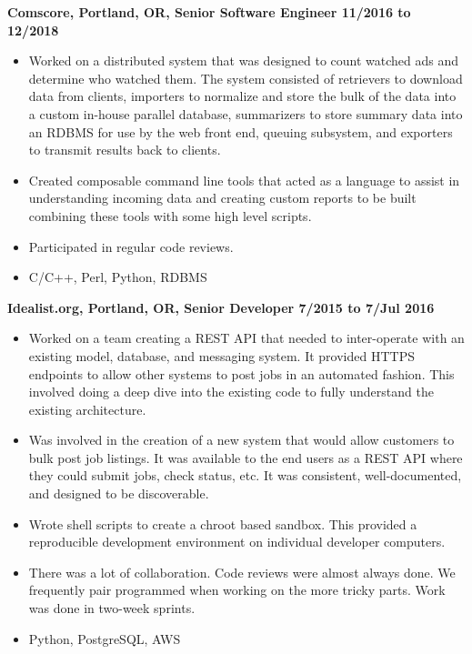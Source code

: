 \documentclass{res}
\begin{document}
\begin{resume}
  {\large \bf Comscore, Portland, OR, Senior Software Engineer \hfill 11/2016 to 12/2018}
  \begin{itemize}

  \item
    Worked on a distributed system that was designed to count watched ads
    and determine who watched them.  The system consisted of retrievers to
    download data from clients, importers to normalize and store the bulk
    of the data into a custom in-house parallel database, summarizers
    to store summary data into an RDBMS for use by the web front end,
    queuing subsystem, and exporters to transmit results back to clients.

  \item
    Created composable command line tools that acted as a language to
    assist in understanding incoming data and creating custom reports to
    be built combining these tools with some high level scripts.

  \item
    Participated in regular code reviews.
\item
 \enlargethispage{\baselineskip}
C/C++, Perl, Python, RDBMS

  \end{itemize}

  {\large \bf Idealist.org, Portland, OR, Senior Developer \hfill 7/2015 to 7/Jul 2016}
  \begin{itemize}
    \item
    Worked on a team creating a REST API that needed
    to inter-operate with an existing model, database, and messaging
    system. It provided HTTPS endpoints to allow other systems to post
    jobs in an automated fashion.  This involved doing
    a deep dive into the existing code to fully understand the existing
    architecture.
    \item
    Was involved in the creation of a new system that would allow
    customers to bulk post job listings.  It was available to the end users
    as a REST API where they could submit jobs, check status, etc.
    It was consistent, well-documented, and designed to be discoverable.
    \item
    Wrote shell scripts to create a chroot based sandbox.  This provided
    a reproducible development environment on individual developer
    computers.
    \item
    There was a lot of collaboration.  Code reviews were almost always
    done.  We frequently pair programmed when working on the
    more tricky parts.  Work was done in two-week sprints.
    \item
    Python, PostgreSQL, AWS
  \end{itemize}


\end{resume}
\end{document}
